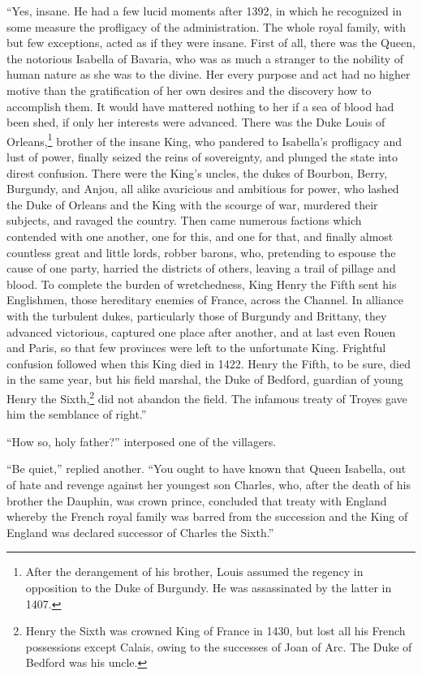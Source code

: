 ``Yes, insane. He had a few lucid moments after 1392, in which he
recognized in some measure the profligacy of the administration. The
whole royal family, with but few exceptions, acted as if they were
insane. First of all, there was the Queen, the notorious Isabella of
Bavaria, who was as much a stranger to the nobility of human nature as
she was to the divine. Her every purpose and act had no higher motive
than the gratification of her own desires and the discovery how to
accomplish them. It would have mattered nothing to her if a sea of blood
had been shed, if only her interests were advanced. There was the Duke
Louis of Orleans,\footnote{After the derangement of his brother, Louis
  assumed the regency in opposition to the Duke of Burgundy. He was
  assassinated by the latter in 1407.} brother of the insane King, who
pandered to Isabella's profligacy and lust of power, finally seized the
reins of sovereignty, and plunged the state into direst confusion. There
were the King's uncles, the dukes of Bourbon, Berry, Burgundy, and
Anjou, all alike avaricious and ambitious for power, who lashed the Duke
of Orleans and the King with the scourge of war, murdered their
subjects, and ravaged the country. Then came numerous factions which
contended with one another, one for this, and one for that, and finally
almost countless great and little lords, robber barons, who, pretending
to espouse the cause of one party, harried the districts of others,
leaving a trail of pillage and blood. To complete the burden of
wretchedness, King Henry the Fifth sent his Englishmen, those hereditary
enemies of France, across the Channel. In alliance with the turbulent
dukes, particularly those of Burgundy and Brittany, they advanced
victorious, captured one place after another, and at last even Rouen and
Paris, so that few provinces were left to the unfortunate King.
Frightful confusion followed when this King died in 1422. Henry the
Fifth, to be sure, died in the same year, but his field marshal, the
Duke of Bedford, guardian of young Henry the Sixth,\footnote{Henry the
  Sixth was crowned King of France in 1430, but lost all his French
  possessions except Calais, owing to the successes of Joan of Arc. The
  Duke of Bedford was his uncle.} did not abandon the field. The
infamous treaty of Troyes gave him the semblance of right.''

``How so, holy father?'' interposed one of the villagers.

``Be quiet,'' replied another. ``You ought to have known that Queen
Isabella, out of hate and revenge against her youngest son Charles, who,
after the death of his brother the Dauphin, was crown prince, concluded
that treaty with England whereby the French royal family was barred from
the succession and the King of England was declared successor of Charles
the Sixth.''

